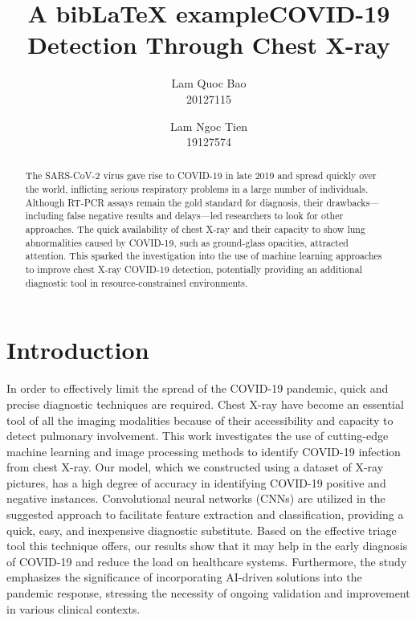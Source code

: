 \documentclass[12pt]{article}
\title{A bibLaTeX example}
\title{\textbf{COVID-19 Detection Through Chest X-ray}}
\author{Lam Quoc Bao \\20127115 \and Lam Ngoc Tien \\19127574}
\date{}
\begin{document}
\maketitle
\begin{abstract}
    The SARS-CoV-2 virus gave rise to COVID-19 in late 2019 and spread quickly over the world, inflicting serious respiratory problems in a large number of individuals. Although RT-PCR assays remain the gold standard for diagnosis, their drawbacks—including false negative results and delays—led researchers to look for other approaches. The quick availability of chest X-ray and their capacity to show lung abnormalities caused by COVID-19, such as ground-glass opacities, attracted attention. This sparked the investigation into the use of machine learning approaches to improve chest X-ray COVID-19 detection, potentially providing an additional diagnostic tool in resource-constrained environments.
\end{abstract}

\maketitle

\section{Introduction}
In order to effectively limit the spread of the COVID-19 pandemic, quick and precise diagnostic techniques are required. Chest X-ray have become an essential tool of all the imaging modalities because of their accessibility and capacity to detect pulmonary involvement. This work investigates the use of cutting-edge machine learning and image processing methods to identify COVID-19 infection from chest X-ray. Our model, which we constructed using a dataset of X-ray pictures, has a high degree of accuracy in identifying COVID-19 positive and negative instances. Convolutional neural networks (CNNs) are utilized in the suggested approach to facilitate feature extraction and classification, providing a quick, easy, and inexpensive diagnostic substitute. Based on the effective triage tool this technique offers, our results show that it may help in the early diagnosis of COVID-19 and reduce the load on healthcare systems. Furthermore, the study emphasizes the significance of incorporating AI-driven solutions into the pandemic response, stressing the necessity of ongoing validation and improvement in various clinical contexts.
\end{document}
